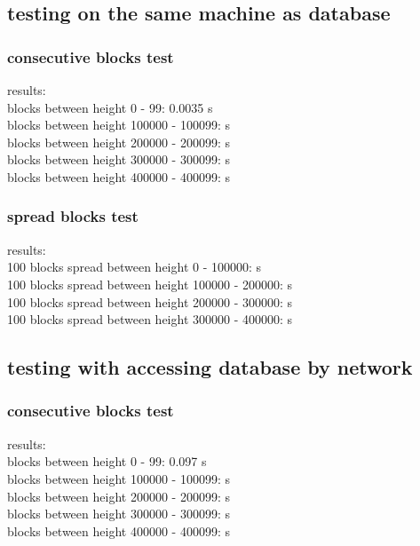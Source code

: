 \documentclass[12pt, en, eng, oneside]{mgr}
\begin{document}
\subsection{testing on the same machine as database} 

\subsubsection{consecutive blocks test}
results:
\\
blocks between height 0 - 99: \quad \quad \quad \hspace*{2em} 0.0035 s\\
blocks between height 100000 - 100099:  s\\
blocks between height 200000 - 200099:  s\\
blocks between height 300000 - 300099:  s\\
blocks between height 400000 - 400099:  s\\

\subsubsection{spread blocks test}
results:
\\
100 blocks spread between height 0 - 100000: \quad \quad {} s\\
100 blocks spread between height 100000 - 200000:  s\\
100 blocks spread between height 200000 - 300000:  s\\
100 blocks spread between height 300000 - 400000:  s\\

\subsection{testing with accessing database by network}

\subsubsection{consecutive blocks test}
results:
\\
blocks between height 0 - 99: \quad \quad \quad \hspace*{2em} 0.097 s\\
blocks between height 100000 - 100099:  s\\
blocks between height 200000 - 200099:  s\\
blocks between height 300000 - 300099:  s\\
blocks between height 400000 - 400099:  s\\
\end{document}
